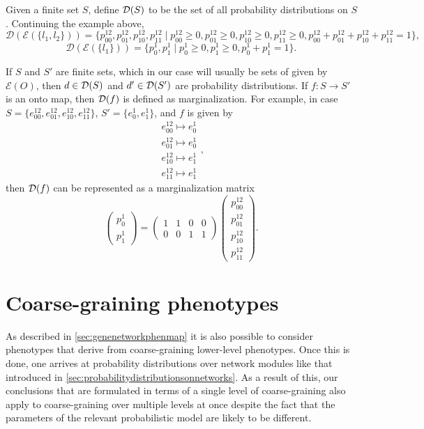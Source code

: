 Given a finite set $S$, define $\mathcal{D}(S)$ to be the set of all probability distributions on $S$. Continuing the example above,
$$\mathcal{D}(\mathcal{E}(\{l_1,l_2\})) = \{p^{12}_{00},p^{12}_{01},p^{12}_{10},p^{12}_{11} \mid p^{12}_{00} \geq 0, p^{12}_{01} \geq 0,p^{12}_{10} \geq 0,p^{12}_{11} \geq 0, p^{12}_{00} + p^{12}_{01} + p^{12}_{10} + p^{12}_{11} = 1 \},$$
$$\mathcal{D}(\mathcal{E}(\{l_1\})) = \{p^{1}_{0}, p^{1}_{1} \mid p^{1}_{0} \geq 0, p^{1}_{1} \geq 0, p^{1}_{0}+p^{1}_{1} = 1 \}.$$

If $S$ and $S'$ are finite sets, which in our case will usually be sets of \gnpm{} given by $\mathcal{E}(O)$, then $d \in \mathcal{D}(S)$ and $d' \in \mathcal{D}(S')$ are probability distributions. If $f \colon S \to S'$
is an onto map, then $\mathcal{D}{}(f)$ is defined as marginalization. For example, in case $S=\{ e^{12}_{00}, e^{12}_{01}, e^{12}_{10}, e^{12}_{11} \}$, $S'=\{ e^{1}_{0}, e^{1}_{1} \}$, and $f$ is given by
\begin{equation}
\begin{aligned}
e^{12}_{00} \mapsto e^{1}_{0}\\
e^{12}_{01} \mapsto e^{1}_{0}\\
e^{12}_{10} \mapsto e^{1}_{1}\\
e^{12}_{11} \mapsto e^{1}_{1}
\end{aligned},
\end{equation}
then $\mathcal{D}{}(f)$ can be represented as a marginalization matrix
\begin{equation}
\begin{pmatrix}
p^{1}_{0}\\
p^{1}_{1}
\end{pmatrix} = \begin{pmatrix}
1 & 1 & 0 & 0\\
0 & 0 & 1 & 1
\end{pmatrix}
\begin{pmatrix}
p^{12}_{00}\\
p^{12}_{01}\\
p^{12}_{10}\\
p^{12}_{11}
\end{pmatrix}.
\end{equation}

\section{Coarse-graining phenotypes}\label{sec:coarsegrainingphenotypes}

As described in \ref{sec:genenetworkphenmap} it is also possible to consider phenotypes that derive from coarse-graining lower-level phenotypes. Once this is done, one arrives at probability distributions over network modules like that introduced in \ref{sec:probabilitydistributionsonnetworks}. As a result of this, our conclusions that are formulated in terms of a single level of coarse-graining \gnpm{} also apply to coarse-graining over multiple levels at once despite the fact that the parameters of the relevant probabilistic model are likely to be different.

